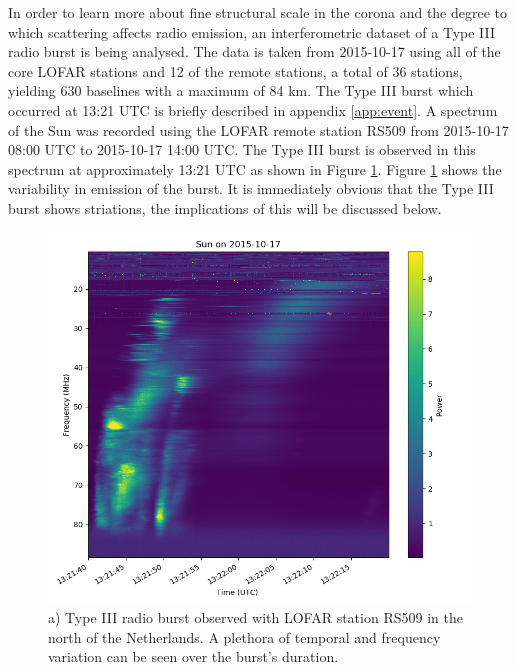 In order to learn more about fine structural scale in the corona and the degree to which scattering affects radio emission, an interferometric dataset of a Type III radio burst is being analysed. The data is taken from 2015-10-17 using all of the core LOFAR stations and 12 of the remote stations, a total of 36 stations, yielding 630 baselines with a maximum of 84 km.
The Type III burst which occurred at 13:21 UTC is briefly described in appendix \ref{app:event}. A spectrum of the Sun was recorded using the LOFAR remote station RS509 from 2015-10-17 08:00 UTC to 2015-10-17 14:00 UTC. The Type III burst is observed in this spectrum at approximately 13:21 UTC as shown in Figure \ref{fig:LOFAR_spec}. Figure \ref{fig:LOFAR_spec} shows the variability in emission of the burst. It is immediately obvious that the Type III burst shows striations, the implications of this will be discussed below.
\begin{figure}
    \centering
    \includegraphics[width=0.75\columnwidth]{Images/L401005_SAP000_B000_S0_P000_bf_d_spec_burst_zoom.png}
    \caption[Type III radio burst observed with LOFAR station RS509]{a) Type III radio burst observed with LOFAR station RS509 in the north of the Netherlands. A plethora of temporal and frequency variation can be seen over the burst's duration.}
    \label{fig:LOFAR_spec}
\end{figure}


